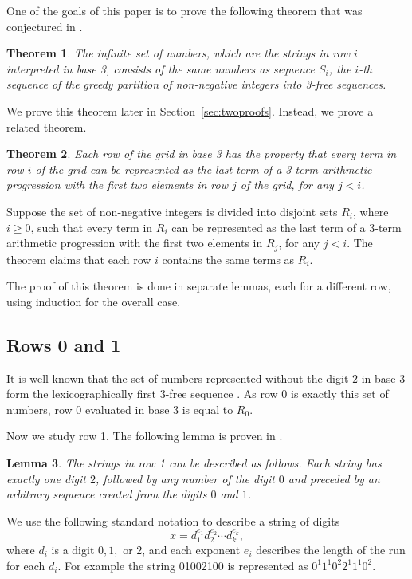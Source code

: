 \documentclass[12pt,reqno]{article}
\theoremstyle{plain}
\newtheorem{theorem}{Theorem}
\newtheorem{lemma}[theorem]{Lemma}
\theoremstyle{definition}
\theoremstyle{remark}
\begin{document}
One of the goals of this paper is to prove the following theorem that was conjectured in \cite{PSS}.

\begin{theorem}\label{thm:main}
The infinite set of numbers, which are the strings in row $i$ interpreted in base 3, consists of the same numbers as sequence $S_i$, the $i$-th sequence of the greedy partition of non-negative integers into 3-free sequences.
\end{theorem}

We prove this theorem later in Section~\ref{sec:twoproofs}. Instead, we prove a related theorem.

\begin{theorem}\label{thm:interm}
Each row of the grid in base 3 has the property that every term in row $i$ of the grid can be represented as the last term of a 3-term arithmetic progression with the first two elements in row $j$ of the grid, for any $j < i$.
\end{theorem}

Suppose the set of non-negative integers is divided into disjoint sets $R_i$, where $i \geq 0$, such that every term in $R_i$ can be represented as the last term of a 3-term arithmetic progression with the first two elements in $R_j$, for any $j < i$. The theorem claims that each row $i$ contains the same terms as $R_i$.

The proof of this theorem is done in separate lemmas, each for a different row, using induction for the overall case. 

\subsection{Rows 0 and 1}

It is well known that the set of numbers represented without the digit $2$ in base $3$ form the lexicographically first 3-free sequence \cite{OS}. As row $0$ is exactly this set of numbers, row $0$ evaluated in base 3 is equal to $R_0$.

Now we study row 1. The following lemma is proven in \cite{PSS}.

\begin{lemma}
The strings in row 1 can be described as follows. Each string has exactly one digit $2$, followed by any number of the digit $0$ and preceded by an arbitrary sequence created from the digits $0$ and $1$.
\end{lemma}

We use the following standard notation to describe a string of digits  \[x = d_1^{e_1} d_2^{e_2} \cdots d_k^{e_k},\] where $d_i$ is a digit $0, 1, $ or $2$, and each exponent $e_i$ describes the length of the run for each $d_i$. For example the string 01002100 is represented as $0^1 1^1 0^2 2^1 1^1 0^2$.
\end{document}
